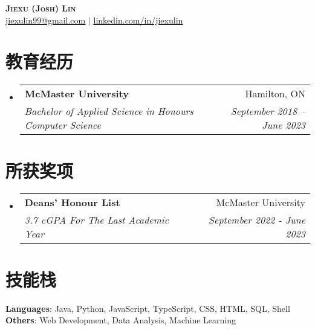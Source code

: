 \documentclass[letterpaper,11pt]{ctexart}
\makeatletter
\newcommand{\resumeSubheading}[4]{
  \vspace{-2pt}\item
    \begin{tabular*}{0.97\textwidth}[t]{l@{\extracolsep{\fill}}r}
      \textbf{#1} & #2 \\
      \textit{\small#3} & \textit{\small #4} \\
    \end{tabular*}\vspace{-7pt}
}
\newcommand{\resumeSubHeadingListStart}{\begin{itemize}[leftmargin=0.15in, label={}]}
\newcommand{\resumeSubHeadingListEnd}{\end{itemize}}
\makeatother
\begin{document}

\begin{center}
    \textbf{\Huge \scshape Jiexu (Josh) Lin} \\ \vspace{1pt}
    \href{mailto:jiexulin99@gmail.com}{\underline{jiexulin99@gmail.com}}
    $|$ \href{https://linkedin.com/in/jiexulin}{\underline{linkedin.com/in/jiexulin}}
\end{center}


\section{教育经历}
  \resumeSubHeadingListStart
    \resumeSubheading
      {McMaster University}{Hamilton, ON}
      {Bachelor of Applied Science in Honours Computer Science}{September 2018 -- June 2023}
  \resumeSubHeadingListEnd

\section{所获奖项}
  \resumeSubHeadingListStart
    \resumeSubheading
      {Deans' Honour List}{McMaster University}
      {3.7 cGPA For The Last Academic Year}{September 2022 - June 2023}
  \resumeSubHeadingListEnd

%
\section{技能栈}
 \begin{itemize}[leftmargin=0.15in, label={}]
    \small{\item{
      \textbf{Languages}{: Java, Python, JavaScript, TypeScript, CSS, HTML, SQL, Shell} \\
      \textbf{Others}{: Web Development, Data Analysis, Machine Learning }
     }}
 \end{itemize}
\end{document}

